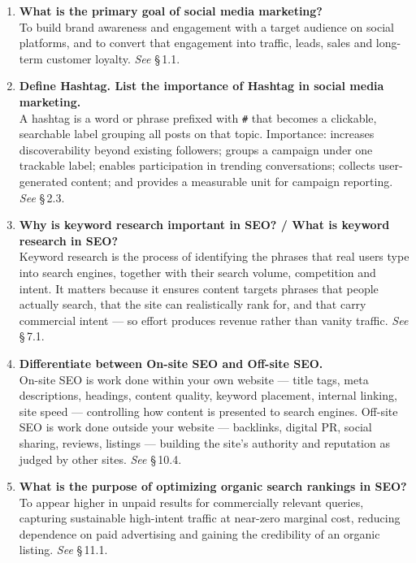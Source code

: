 \begin{enumerate}[leftmargin=2.2em,itemsep=1.1ex]
\item \textbf{What is the primary goal of social media marketing?}
      \\
      To build brand awareness and engagement with a target audience on social
      platforms, and to convert that engagement into traffic, leads, sales and
      long-term customer loyalty. \hfill\emph{See} \S\,1.1.

\item \textbf{Define Hashtag. List the importance of Hashtag in social media
      marketing.} \\
      A hashtag is a word or phrase prefixed with \texttt{\#} that becomes a
      clickable, searchable label grouping all posts on that topic. Importance:
      increases discoverability beyond existing followers; groups a campaign
      under one trackable label; enables participation in trending
      conversations; collects user-generated content; and provides a measurable
      unit for campaign reporting. \hfill\emph{See} \S\,2.3.

\item \textbf{Why is keyword research important in SEO? / What is keyword
      research in SEO?}
      \\
      Keyword research is the process of identifying the phrases that real users
      type into search engines, together with their search volume, competition
      and intent. It matters because it ensures content targets phrases that
      people actually search, that the site can realistically rank for, and that
      carry commercial intent --- so effort produces revenue rather than vanity
      traffic. \hfill\emph{See} \S\,7.1.

\item \textbf{Differentiate between On-site SEO and Off-site SEO.}
      \\
      On-site SEO is work done within your own website --- title tags, meta
      descriptions, headings, content quality, keyword placement, internal
      linking, site speed --- controlling how content is presented to search
      engines. Off-site SEO is work done outside your website --- backlinks,
      digital PR, social sharing, reviews, listings --- building the site's
      authority and reputation as judged by other sites.
      \hfill\emph{See} \S\,10.4.

\item \textbf{What is the purpose of optimizing organic search rankings in SEO?}
      \\
      To appear higher in unpaid results for commercially relevant queries,
      capturing sustainable high-intent traffic at near-zero marginal cost,
      reducing dependence on paid advertising and gaining the credibility of an
      organic listing. \hfill\emph{See} \S\,11.1.


\end{enumerate}
